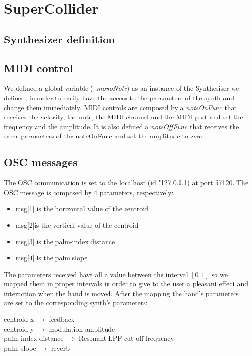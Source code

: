 \documentclass[a4paper,12pt]{report}
\begin{document}
\section*{SuperCollider}

\subsection*{Synthesizer definition}

\subsection*{MIDI control} 
We defined a global variable (\emph{~monoNote}) as an instance of the Synthesiser we defined, in order to easily have the access to the parameters of the synth and change them immediately.
MIDI controls are composed by a \emph{noteOnFunc} that receives the velocity, the note, the MIDI channel and the MIDI port and set the frequency and the amplitude. It is also defined a \emph{noteOffFunc} that receives the same parameters of the noteOnFunc and set the amplitude to zero.

\subsection*{OSC messages}
The OSC communication is set to the localhost (id "127.0.0.1) at port 57120. The OSC message is composed by 4 parameters, respectively: 
\begin{itemize}
	\item msg[1] is the horizontal value of the centroid
	\item msg[2]is the vertical value of the centroid
	\item msg[3] is the palm-index distance
	\item msg[4] is the palm slope
\end{itemize}
The parameters received have all a value between the interval $[0,1]$ so we mapped them in proper intervals in order to give to the user a pleasant effect and interaction when the hand is moved. After the mapping the hand's parameters are set to the corresponding synth's parameters:
\begin{center}
centroid x $\rightarrow$ feedback\\
centroid y $\rightarrow$ modulation amplitude\\
palm-index distance $\rightarrow$ Resonant LPF cut off frequency\\
palm slope $\rightarrow$ reverb\\
\end{center}
\end{document}
